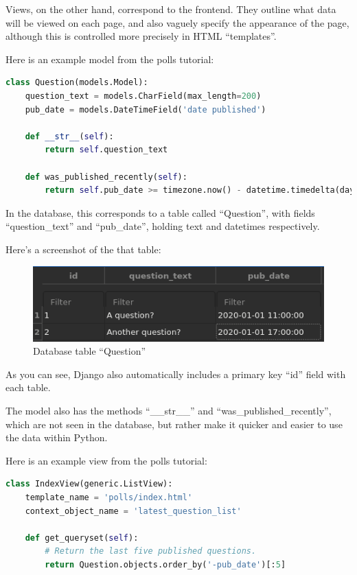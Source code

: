 \documentclass{article}
\begin{document}
Views, on the other hand, correspond to the frontend.
They outline what data will be viewed on each page,
and also vaguely specify the appearance of the page,
although this is controlled more precisely in HTML ``templates''.

Here is an example model from the polls tutorial:
\begin{lstlisting}[language=Python]
class Question(models.Model):
    question_text = models.CharField(max_length=200)
    pub_date = models.DateTimeField('date published')

    def __str__(self):
        return self.question_text

    def was_published_recently(self):
        return self.pub_date >= timezone.now() - datetime.timedelta(days=1)
\end{lstlisting}

In the database,
this corresponds to a table called ``Question'',
with fields ``question\_text'' and ``pub\_date'',
holding text and datetimes respectively.

Here's a screenshot of the that table:

\begin{figure}[h!]
	\includegraphics[width=\linewidth]{Images/question_table.png}
	\caption{Database table ``Question''}
	\label{fig:database1}
\end{figure}

As you can see,
Django also automatically includes a primary key ``id'' field with each table.

The model also has the methods ``\_\_str\_\_'' and ``was\_published\_recently'',
which are not seen in the database,
but rather make it quicker and easier to use the data within Python.

Here is an example view from the polls tutorial:
\begin{lstlisting}[language=Python]
class IndexView(generic.ListView):
    template_name = 'polls/index.html'
    context_object_name = 'latest_question_list'

    def get_queryset(self):
        # Return the last five published questions.
        return Question.objects.order_by('-pub_date')[:5]
\end{lstlisting}
\end{document}

